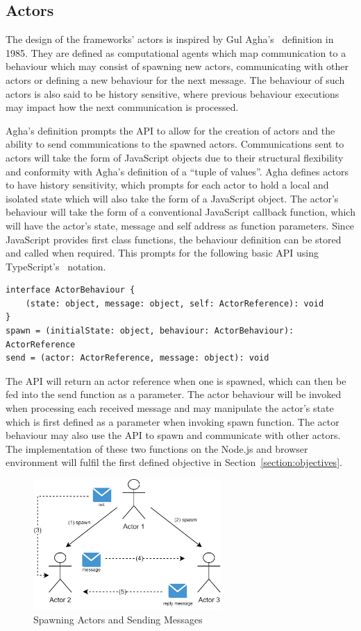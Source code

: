 \documentclass[oneside]{um-fict}
\begin{document}
\subsection{Actors}
The design of the frameworks' actors is inspired by Gul Agha's~\cite{agha1985actors} definition in 1985. They are defined as computational agents which map communication to a behaviour which may consist of spawning new actors, communicating with other actors or defining a new behaviour for the next message. The behaviour of such actors is also said to be history sensitive, where previous behaviour executions may impact how the next communication is processed.

Agha's definition prompts the API to allow for the creation of actors and the ability to send communications to the spawned actors. Communications sent to actors will take the form of JavaScript objects due to their structural flexibility and conformity with Agha's definition of a “tuple of values”. Agha defines actors to have history sensitivity, which prompts for each actor to hold a local and isolated state which will also take the form of a JavaScript object. The actor's behaviour will take the form of a conventional JavaScript callback function, which will have the actor's state, message and self address as function parameters. Since JavaScript provides first class functions, the behaviour definition can be stored and called when required. This prompts for the following basic API using TypeScript's~\cite{typescript} notation.
\begin{lstlisting}
interface ActorBehaviour {
    (state: object, message: object, self: ActorReference): void
}
spawn = (initialState: object, behaviour: ActorBehaviour): ActorReference
send = (actor: ActorReference, message: object): void    
\end{lstlisting}
The API will return an actor reference when one is spawned, which can then be fed into the send function as a parameter. The actor behaviour will be invoked when processing each received message and may manipulate the actor's state which is first defined as a parameter when invoking spawn function. The actor behaviour may also use the API to spawn and communicate with other actors. The implementation of these two functions on the Node.js and browser environment will fulfil the first defined objective in Section~\ref{section:objectives}. 
\begin{figure}[H]
    \begin{centering}
        \includegraphics[width=270px]{resources/actors.png}
        \caption{Spawning Actors and Sending Messages}\label{fig:actors}
    \end{centering}
\end{figure}
\end{document}
